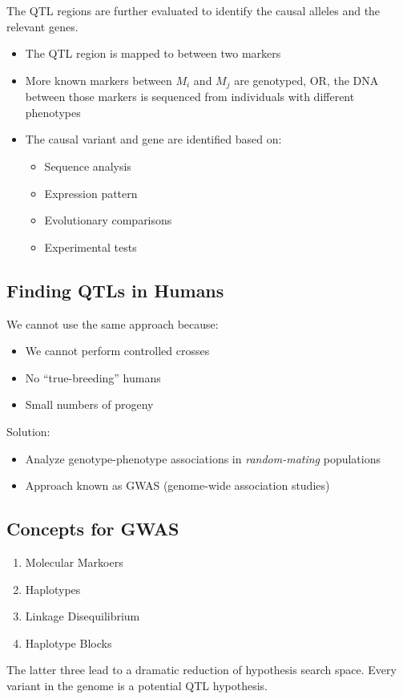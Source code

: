 \documentclass[10pt]{article}
\begin{document}
The QTL regions are further evaluated to identify the causal alleles and the relevant genes.
\begin{itemize}
	\item The QTL region is mapped to between two markers
	\item More known markers between $M_i$ and $M_j$ are genotyped, OR, the DNA between those markers is sequenced from individuals with different phenotypes
    \item The causal variant and gene are identified based on:
    \begin{itemize}
	    \item Sequence analysis
	    \item Expression pattern
	    \item Evolutionary comparisons
	    \item Experimental tests
    \end{itemize}
\end{itemize}

\subsection*{Finding QTLs in Humans}
We cannot use the same approach because:
\begin{itemize}
	\item We cannot perform controlled crosses
	\item No ``true-breeding'' humans
	\item Small numbers of progeny
\end{itemize}
Solution:
\begin{itemize}
	\item Analyze genotype-phenotype associations in \textit{random-mating} populations
	\item Approach known as GWAS (genome-wide association studies)
\end{itemize}

\subsection*{Concepts for GWAS}
\begin{enumerate}
	\item Molecular Markoers
	\item Haplotypes
	\item Linkage Disequilibrium
	\item Haplotype Blocks
\end{enumerate}
The latter three lead to a dramatic reduction of hypothesis search space.  Every variant in the genome is a potential QTL hypothesis.
\end{document}
